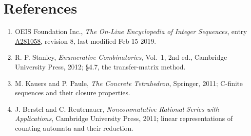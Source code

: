 \documentclass[11pt]{article}
\theoremstyle{definition}
\begin{document}
\section{References}

\begin{enumerate}

\item OEIS Foundation Inc., \emph{The On-Line Encyclopedia of Integer Sequences}, entry \href{https://oeis.org/A281058}{A281058}, revision 8, last modified Feb 15 2019.

\item R. P. Stanley, \emph{Enumerative Combinatorics}, Vol.~1, 2nd ed., Cambridge University Press, 2012; \S4.7, the transfer-matrix method.

\item M. Kauers and P. Paule, \emph{The Concrete Tetrahedron}, Springer, 2011; C-finite sequences and their closure properties.

\item J. Berstel and C. Reutenauer, \emph{Noncommutative Rational Series with Applications}, Cambridge University Press, 2011; linear representations of counting automata and their reduction.

\end{enumerate}
\end{document}
